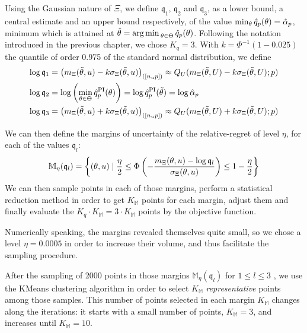 \documentclass[../../Main_ManuscritThese.tex]{subfiles}
\begin{document}
Using the Gaussian nature of $\Xi$, we define $\mathfrak{q}_1$,
$\mathfrak{q}_2$ and $\mathfrak{q}_3$, as a lower bound, a central
estimate and an upper bound respectively, of the value
$\min_\theta \hat{q}_p(\theta)=\hat{\alpha}_p$, minimum which is attained at
$\hat{\theta}= \operatorname*{arg\,min \,}_{\theta\in\Theta} \hat{q}_p(\theta)$. Following the
notation introduced in the previous chapter, we chose $K_q = 3$.
With $k=\Phi^{-1}(1 - 0.025)$ the quantile of order \num{0.975} of the
standard normal distribution, we define
\begin{align}
  \log {\mathfrak{q}}_1 &= \left(m_{\Xi}(\tilde{\theta}, u) - k \sigma_{\Xi}(\tilde{\theta}, u)\right)_{([n_{u}p])} \approx Q_U(m_{\Xi}(\tilde{\theta}, U) - k \sigma_{\Xi}(\tilde{\theta}, U); p) \\
  \log \mathfrak{q}_2 &= \log \left(\min_{\theta\in\Theta}\hat{q}^{\mathrm{PI}}_p(\theta) \right) = \log \hat{q}^{\mathrm{PI}}_p(\tilde{\theta}) = \log \hat{\alpha}_p \\
  \log \mathfrak{q}_3 &= \left(m_{\Xi}(\tilde{\theta}, u) + k \sigma_{\Xi}(\tilde{\theta}, u)\right)_{([n_{u}p])} \approx Q_U(m_{\Xi}(\tilde{\theta}, U) + k \sigma_{\Xi}(\tilde{\theta}, U); p)
\end{align}

We can then define the margins of uncertainty of the relative-regret of
level $\eta$, for each of the values $\mathfrak{q}_l$:
\begin{equation}
  \label{eq:def_metaql}
  \mathbb{M}_{\eta}(\mathfrak{q}_l) = \left\{(\theta, u) \mid \frac{\eta}{2} \leq \Phi\left(-\frac{m_{\Xi}(\theta, u) - \log \mathfrak{q}_l}{\sigma_{\Xi}(\theta, u)}\right) \leq 1 - \frac{\eta}{2}\right\}
\end{equation}
We can then sample points in each of those margins, perform a statistical
reduction method in order to get $K_{\mathbb{M}}$ points for each
margin, adjust them and finally evaluate the $K_q \cdot K_{\mathbb{M}} =  3\cdot K_{\mathbb{M}}$
points by the objective function.


Numerically speaking, the margins revealed themselves quite small, so
we chose a level $\eta=0.0005$ in order to increase their volume, and
thus facilitate the sampling procedure.

After the sampling of \num{2000} points in those margins
$\mathbb{M}_{\eta}(\mathfrak{q}_l)$ for $1\leq l \leq 3$ , we use the
KMeans clustering algorithm in order to select $K_{\mathbb{M}}$
\emph{representative} points among those samples.  This number of
points selected in each margin $K_{\mathbb{M}}$ changes along the
iterations: it starts with a small number of points,
$K_{\mathbb{M}}=3$, and increases until $K_{\mathbb{M}}=10$.
\end{document}
